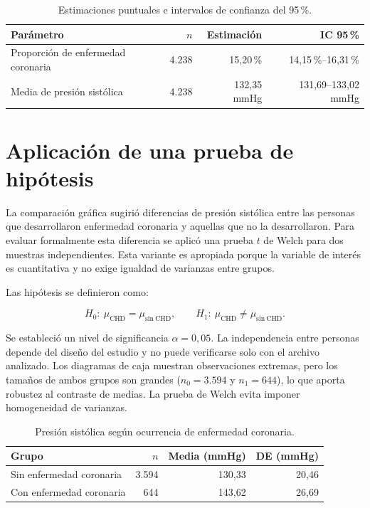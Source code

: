 \documentclass[11pt,a4paper]{article}
\begin{document}
\begin{table}[H]
\centering
\caption{Estimaciones puntuales e intervalos de confianza del 95\,\%.}
\label{tab:intervalos}
\small
\begin{tabular}{lrrr}
\toprule
\textbf{Parámetro} & \textbf{$n$} & \textbf{Estimación} & \textbf{IC 95\,\%} \\
\midrule
Proporción de enfermedad coronaria & 4.238 & 15,20\,\% & 14,15\,\%--16,31\,\% \\
Media de presión sistólica         & 4.238 & 132,35 mmHg & 131,69--133,02 mmHg \\
\bottomrule
\end{tabular}
\end{table}

\section{Aplicación de una prueba de hipótesis}

La comparación gráfica sugirió diferencias de presión sistólica entre las personas que desarrollaron enfermedad coronaria y aquellas que no la desarrollaron. Para evaluar formalmente esta diferencia se aplicó una prueba $t$ de Welch para dos muestras independientes. Esta variante es apropiada porque la variable de interés es cuantitativa y no exige igualdad de varianzas entre grupos.

Las hipótesis se definieron como:

\[
H_0:\ \mu_{\mathrm{CHD}}=\mu_{\mathrm{sin\ CHD}},
\qquad
H_1:\ \mu_{\mathrm{CHD}}\neq\mu_{\mathrm{sin\ CHD}}.
\]

Se estableció un nivel de significancia $\alpha=0,05$. La independencia entre personas depende del diseño del estudio y no puede verificarse solo con el archivo analizado. Los diagramas de caja muestran observaciones extremas, pero los tamaños de ambos grupos son grandes ($n_0=3.594$ y $n_1=644$), lo que aporta robustez al contraste de medias. La prueba de Welch evita imponer homogeneidad de varianzas.

\begin{table}[H]
\centering
\caption{Presión sistólica según ocurrencia de enfermedad coronaria.}
\label{tab:welch}
\small
\begin{tabular}{lrrr}
\toprule
\textbf{Grupo} & \textbf{$n$} & \textbf{Media (mmHg)} & \textbf{DE (mmHg)} \\
\midrule
Sin enfermedad coronaria & 3.594 & 130,33 & 20,46 \\
Con enfermedad coronaria & 644   & 143,62 & 26,69 \\
\bottomrule
\end{tabular}
\end{table}
\end{document}

